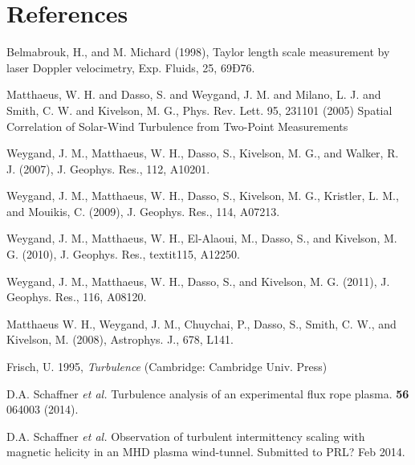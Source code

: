 \documentclass[aip,prl,amsmath,amssymb,reprint,superscriptaddress]{revtex4-1} %
\begin{document}
\section*{References}
\begin{thebibliography}{99}

Belmabrouk, H., and M. Michard (1998), Taylor length scale measurement by laser Doppler velocimetry, Exp. Fluids, 25, 69Ð76.

Matthaeus, W. H. and Dasso, S. and Weygand, J. M. and Milano, L. J. and Smith, C. W. and Kivelson, M. G., Phys. Rev. Lett. 95, 231101 (2005) Spatial Correlation of Solar-Wind Turbulence from Two-Point Measurements

Weygand, J. M., Matthaeus, W. H., Dasso, S., Kivelson, M. G.,
and Walker, R. J. (2007), J. Geophys. Res., 112, A10201.

Weygand, J. M., Matthaeus, W. H., Dasso, S., Kivelson, M. G.,
Kristler, L. M., and Mouikis, C. (2009), J. Geophys. Res., 114,
A07213.

Weygand, J. M., Matthaeus, W. H., El-Alaoui, M., Dasso, S., and
Kivelson, M. G. (2010), J. Geophys. Res., textit115, A12250.

Weygand, J. M., Matthaeus, W. H., Dasso, S., and Kivelson, M.
G. (2011), J. Geophys. Res., 116, A08120.

Matthaeus W. H., Weygand, J. M., Chuychai, P., Dasso, S.,
Smith, C. W., and Kivelson, M. (2008), Astrophys. J., 678,
L141.

Frisch, U. 1995, {\it Turbulence} (Cambridge: Cambridge Univ. Press)

 D.A. Schaffner {\it et al.} Turbulence analysis of an experimental flux rope plasma. {\bf 56} 064003 (2014).

 D.A. Schaffner {\it et al.} Observation of turbulent intermittency scaling with magnetic helicity in an MHD plasma wind-tunnel. Submitted to PRL? Feb 2014.






\end{thebibliography}
\end{document}
